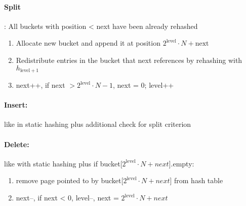  \paragraph{Split}: All buckets with position < next have been already rehashed \\
 \begin{enumerate}
     \item Allocate new bucket and append it at position $2^{\text{level}} \cdot N + \text{next}$
     \item Redistribute entries in the bucket that next references by rehashing with $h_{\text{level}+1}$
     \item next++, if next $> 2^{\text{level}} \cdot N - 1$, next = 0; level++
 \end{enumerate}
 
 \paragraph{Insert:} like in static hashing plus additional check for split criterion \\
 
 \paragraph{Delete:} like with static hashing plus if bucket[$2^{\text{level}} \cdot N + next$].empty:
 \begin{enumerate}
     \item remove page pointed to by bucket[$2^{\text{level}} \cdot N + next$] from hash table 
     \item next--, if next < 0, level--, next = $2^{\text{level}} \cdot N + next$
 \end{enumerate}